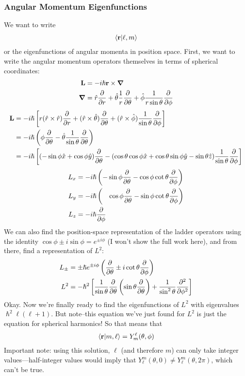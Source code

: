 \documentclass[a4paper]{article}
\begin{document}
\subsubsection{Angular Momentum Eigenfunctions}
We want to write
\[ \left\langle \boldsymbol{\mathbf{r}}\middle\vert \ell,m \right\rangle \]
or the eigenfunctions of angular momenta in position space. First, we want
to write the angular momentum operators themselves in terms of spherical
coordinates:
\begin{align*}
	\vec{L} &= -i\hslash\vec{r}\times\del\\
	\del &= \hat{r}\pd{r}+\hat{\theta}\frac{1}{r}\pd{\theta}+\hat{\phi}
	\frac{1}{r\sin\theta}\pd{\phi}
\end{align*}
\begin{align*}
	\vec{L} &= -i\hslash\left[r(\hat{r}\times\hat{r})\pd{r} +
		(\hat{r}\times\hat{\theta})\pd{\theta}+
		(\hat{r}\times\hat{\phi})\frac{1}{\sin\theta}\pd{\phi}
	\right]\\
	&= -i\hslash\left(\phi\pd{\theta}-\hat{\theta}\frac{1}{\sin\theta}
	\pd{\theta}\right)\\
	&= -i\hslash\left[(-\sin\phi\hat{x}+\cos\phi\hat{y})\pd{\theta}-
	(\cos\theta\cos\phi\hat{x}+\cos\theta\sin\phi\hat{y}-\sin\theta\hat{z})
	\frac{1}{\sin\theta}\pd{\phi}\right]
\end{align*}
\begin{align*}
	L_x &= -i\hslash\left(-\sin\phi\pd{\theta}-\cos\phi\cot\theta\pd{\phi}
	\right)\\
	L_y &= -i\hslash\left(\ \ \ \cos\phi\pd{\theta}-\sin\phi\cot\theta
	\pd{\phi}\right)\\
	L_z &= -i\hslash\pd{\phi}
\end{align*}
We can also find the position-space representation of the ladder operators
using the identity $\cos\phi\pm i\sin\phi = e^{\pm i\phi}$ (I won't show the
full work here), and from there, find a representation of $L^2$:
\begin{align*}
	L_\pm &= \pm\hslash e^{\pm i\phi}\left( 
		\pd{\theta}\pm i\cot\theta\pd{\phi}
	\right)\\
	L^2 &= -\hslash^2\left[\frac{1}{\sin\theta}\pd{\theta}\left(
	\sin\theta\pd{\theta}\right)+\frac{1}{\sin^2\theta}\pder{^2}{\phi^2}
	\right]
\end{align*}
Okay. Now we're finally ready to find the eigenfunctions of $L^2$ with
eigenvalues $\hslash^2\ell(\ell+1)$. But note--this equation we've just found
for $L^2$ is just the equation for spherical harmonics! So that means that
\[ \left\langle \boldsymbol{\mathbf{r}}\middle\vert m,\ell \right\rangle = Y_m^\ell(\theta,\phi) \]
Important note: using this solution, $\ell$ (and therefore $m$) can only take
integer values---half-integer values would imply that
$Y_\ell^m(\theta,0) \neq Y_\ell^m(\theta,2\pi)$, which can't be true.
\end{document}
